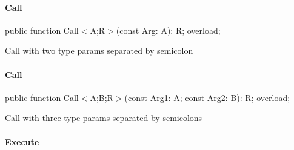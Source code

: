 \documentclass{report}
\begin{document}
\paragraph*{Call}\hspace*{\fill}

\begin{list}{}{
\setlength{\itemindent}{0cm}
\setlength{\listparindent}{0cm}
\setlength{\leftmargin}{\evensidemargin}
\addtolength{\leftmargin}{\tmplength}
\settowidth{\labelsep}{X}
\addtolength{\leftmargin}{\labelsep}
\setlength{\labelwidth}{\tmplength}
}
\begin{flushleft}
\item[\textbf{Declaration}\hfill]
\begin{ttfamily}
public function Call{$<$}A;R{$>$}(const Arg: A): R; overload;\end{ttfamily}


\end{flushleft}
\par
\item[\textbf{Description}]
Call with two type params separated by semicolon

\end{list}
\paragraph*{Call}\hspace*{\fill}

\begin{list}{}{
\setlength{\itemindent}{0cm}
\setlength{\listparindent}{0cm}
\setlength{\leftmargin}{\evensidemargin}
\addtolength{\leftmargin}{\tmplength}
\settowidth{\labelsep}{X}
\addtolength{\leftmargin}{\labelsep}
\setlength{\labelwidth}{\tmplength}
}
\begin{flushleft}
\item[\textbf{Declaration}\hfill]
\begin{ttfamily}
public function Call{$<$}A;B;R{$>$}(const Arg1: A; const Arg2: B): R; overload;\end{ttfamily}


\end{flushleft}
\par
\item[\textbf{Description}]
Call with three type params separated by semicolons

\end{list}
\paragraph*{Execute}\hspace*{\fill}
\end{document}
